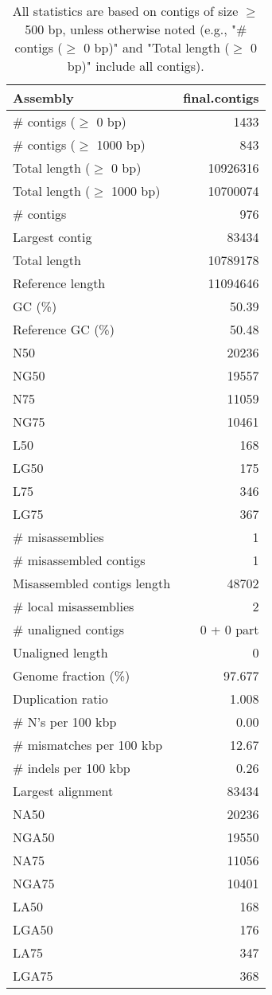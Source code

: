 \documentclass[12pt,a4paper]{article}
\begin{document}
\begin{table}[ht]
\begin{center}
\caption{All statistics are based on contigs of size $\geq$ 500 bp, unless otherwise noted (e.g., "\# contigs ($\geq$ 0 bp)" and "Total length ($\geq$ 0 bp)" include all contigs).}
\begin{tabular}{|l*{1}{|r}|}
\hline
Assembly & final.contigs \\ \hline
\# contigs ($\geq$ 0 bp) & 1433 \\ \hline
\# contigs ($\geq$ 1000 bp) & 843 \\ \hline
Total length ($\geq$ 0 bp) & 10926316 \\ \hline
Total length ($\geq$ 1000 bp) & 10700074 \\ \hline
\# contigs & 976 \\ \hline
Largest contig & 83434 \\ \hline
Total length & 10789178 \\ \hline
Reference length & 11094646 \\ \hline
GC (\%) & 50.39 \\ \hline
Reference GC (\%) & 50.48 \\ \hline
N50 & 20236 \\ \hline
NG50 & 19557 \\ \hline
N75 & 11059 \\ \hline
NG75 & 10461 \\ \hline
L50 & 168 \\ \hline
LG50 & 175 \\ \hline
L75 & 346 \\ \hline
LG75 & 367 \\ \hline
\# misassemblies & 1 \\ \hline
\# misassembled contigs & 1 \\ \hline
Misassembled contigs length & 48702 \\ \hline
\# local misassemblies & 2 \\ \hline
\# unaligned contigs & 0 + 0 part \\ \hline
Unaligned length & 0 \\ \hline
Genome fraction (\%) & 97.677 \\ \hline
Duplication ratio & 1.008 \\ \hline
\# N's per 100 kbp & 0.00 \\ \hline
\# mismatches per 100 kbp & 12.67 \\ \hline
\# indels per 100 kbp & 0.26 \\ \hline
Largest alignment & 83434 \\ \hline
NA50 & 20236 \\ \hline
NGA50 & 19550 \\ \hline
NA75 & 11056 \\ \hline
NGA75 & 10401 \\ \hline
LA50 & 168 \\ \hline
LGA50 & 176 \\ \hline
LA75 & 347 \\ \hline
LGA75 & 368 \\ \hline
\end{tabular}
\end{center}
\end{table}
\end{document}
